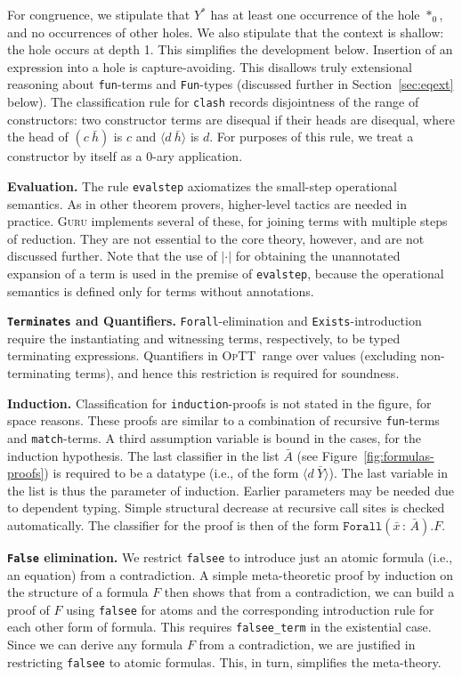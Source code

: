 \documentclass{fundam}
\newcommand{\optt}{\textsc{OpTT}}
\begin{document}
For congruence, we stipulate that $Y^*$ has at least one occurrence of
the hole $*_0$, and no occurrences of other holes.  We also stipulate
that the context is shallow: the hole occurs at depth 1.  This
simplifies the development below.  Insertion of an expression into a
hole is capture-avoiding.  This disallows truly extensional reasoning
about \texttt{fun}-terms and \texttt{Fun}-types (discussed further in
Section~\ref{sec:eqext} below).  The classification rule for
\texttt{clash} records disjointness of the range of constructors: two
constructor terms are disequal if their heads are disequal, where the
head of $(c\ \bar{h})$ is $c$ and $\langle d\ \bar{h}\rangle$ is $d$.
For purposes of this rule, we treat a constructor by itself as a 0-ary
application.

\textbf{Evaluation.} The rule \texttt{evalstep} axiomatizes the
small-step operational semantics.  As in other theorem provers,
higher-level tactics are needed in practice.  \textsc{Guru} implements
several of these, for joining terms with multiple steps of reduction.
They are not essential to the core theory, however, and are not
discussed further.  Note that the use of $|\cdot|$ for obtaining the
unannotated expansion of a term is used in the premise of
\texttt{evalstep}, because the operational semantics is defined only
for terms without annotations.

\textbf{\texttt{Terminates} and Quantifiers.} \texttt{Forall}-elimination
and \texttt{Exists}-introduction require the instantiating and
witnessing terms, respectively, to be typed terminating expressions.
Quantifiers in \optt\ range over values (excluding non-terminating
terms), and hence this restriction is required for soundness.

\textbf{Induction.} Classification for \texttt{induction}-proofs is
not stated in the figure, for space reasons.  These proofs are similar
to a combination of recursive \texttt{fun}-terms and
\texttt{match}-terms.  A third assumption variable is bound in the
cases, for the induction hypothesis.  The last classifier in the list
$\bar{A}$ (see Figure~\ref{fig:formulas-proofs}) is required to be a
datatype (i.e., of the form $\langle d\ \bar{Y}\rangle$).  The last
variable in the list is thus the parameter of induction.  Earlier
parameters may be needed due to dependent typing.  Simple structural
decrease at recursive call sites is checked automatically.  The
classifier for the proof is then of the form
$\texttt{Forall}(\bar{x}\,:\,\bar{A}). F$.

\textbf{\texttt{False} elimination.} We restrict \texttt{falsee} to
introduce just an atomic formula (i.e., an equation) from a
contradiction.  A simple meta-theoretic proof by induction on the
structure of a formula $F$ then shows that from a contradiction, we
can build a proof of $F$ using \texttt{falsee} for atoms and the
corresponding introduction rule for each other form of formula.  This
requires \texttt{falsee\_term} in the existential case.  Since we can
derive any formula $F$ from a contradiction, we are justified in
restricting \texttt{falsee} to atomic formulas.  This, in turn,
simplifies the meta-theory.
\end{document}
